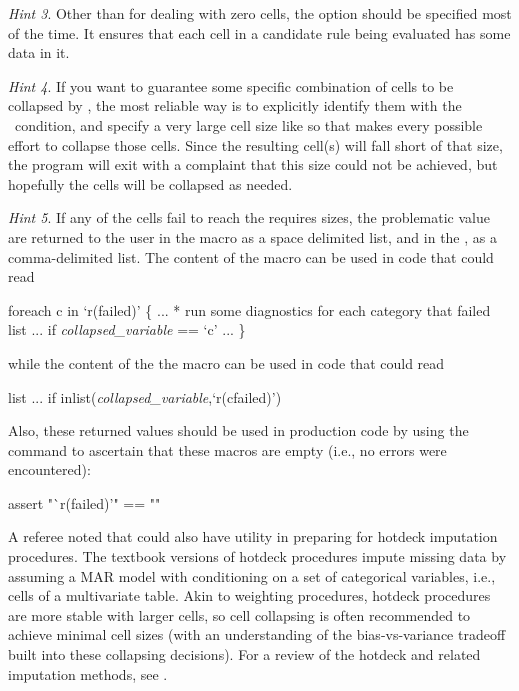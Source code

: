 \textit{Hint 3}. Other than for dealing with zero cells, the option  should be specified
most of the time. It ensures that each cell in a candidate rule being evaluated has some data in it.

\textit{Hint 4}.
If you want to guarantee some specific combination of cells to be collapsed by ,
the most reliable way is to explicitly identify them with the \ifexp\ condition, and specify
a very large cell size like  so that  makes every possible
effort to collapse those cells. Since the resulting cell(s) will fall short of that size, the program will exit
with a complaint that this size could not be achieved,
but hopefully the cells will be collapsed as needed.

\textit{Hint 5}.
If any of the cells fail to reach the requires sizes, the problematic value are returned to the user
in the  macro as a space delimited list, and in the , as a comma-delimited list.
The content of the  macro can be used in code that could read

\begin{stlog}
foreach c in `r(failed)' \{
    ...
    * run some diagnostics for each category that failed
    list ... if \textit{collapsed\_variable} == `c'
    ...
\}
\end{stlog}
while the content of the the  macro can be used in code that could read
\begin{stlog}
list ... if inlist(\textit{collapsed\_variable},`r(cfailed)')
\end{stlog}
Also, these returned values should be used in production code by using the  command
\citep{gould:2003:tip3} to ascertain that these macros are empty (i.e., no errors
were encountered):
\begin{stlog}
assert "`r(failed)'" == ""
\end{stlog}



\bigskip

A referee noted that  could also have utility in preparing for hotdeck imputation procedures.
The textbook versions of hotdeck procedures impute missing data by assuming a MAR model \citep{rubin:1976}
with conditioning on a set of categorical variables, i.e., cells of a multivariate table. Akin to weighting procedures,
hotdeck procedures are more stable with larger cells, so cell collapsing is often recommended to achieve
minimal cell sizes (with an understanding of the bias-vs-variance tradeoff built into these collapsing decisions).
For a review of the hotdeck and related imputation methods, see \citet{andridge:little:2010}.

